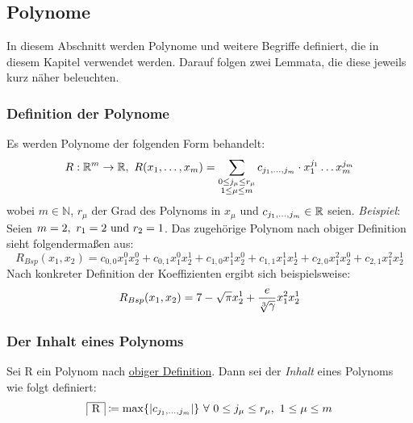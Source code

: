 
\subsection{Polynome}
    \label{subsec:polynomials}
    \textrm{In diesem Abschnitt werden Polynome und weitere Begriffe definiert, die in diesem Kapitel verwendet werden.
    Darauf folgen zwei Lemmata, die diese jeweils kurz näher beleuchten.}
    
    \subsubsection{Definition der Polynome}
        \label{subsubsec:def-poly}
        Es werden Polynome der folgenden Form behandelt:
        \begin{equation}
            R : \mathbb{R}^m \rightarrow \mathbb{R},\
            R(x_1, \dots, x_m) = \sum_{\substack{0 \leq j_\mu \leq r_\mu \\ 1 \leq \mu \leq m}}
            c_{j_1, \dots, j_m} \cdot x_1^{j_1} \dots x_m^{j_m} \label{eq:def-poly}
        \end{equation}
        wobei $m \in \mathbb{N}$, $r_\mu$ der Grad des Polynoms in $x_\mu$ und $c_{j_1, \dots, j_m} \in \mathbb{R}$ seien.
        \newpage
        \emph{Beispiel}: Seien $m = 2,\ r_1 = 2 \ \textrm{und}\  r_2 = 1$.
        \newline
        \textrm{Das zugehörige Polynom nach obiger Definition sieht folgendermaßen aus:}
        \begin{equation*}
            R_{Bsp}(x_1, x_2) = c_{0,0} x_1^0 x_2^0 + c_{0,1} x_1^0 x_2^1 + c_{1,0} x_1^1 x_2^0 + c_{1,1} x_1^1 x_2^1 +
            c_{2, 0} x_1^2 x_2^0 + c_{2,1} x_1^2 x_2^1
        \end{equation*}
        Nach konkreter Definition der Koeffizienten ergibt sich beispielsweise:
        \begin{equation*}
            R_{Bsp}(x_1, x_2) = 7 - \sqrt{\pi} x_2^1 + \frac{e}{\sqrt[3]{\gamma}} x_1^2 x_2^1
        \end{equation*}
    
    \subsubsection{Der Inhalt eines Polynoms}
        \label{subsubsec:def-content}
        Sei R ein Polynom nach \hyperref[subsubsec:def-poly]{obiger Definition}.
        \newline
        Dann sei der \emph{Inhalt} eines Polynoms wie folgt definiert:
        \begin{equation}
            \content{R} \coloneq \max\{|c_{\enum{j_1}{j_m}}| \} \  \forall \  0 \leq j_\mu \leq r_\mu, \
            1 \leq \mu \leq m \label{eq:def-content}
        \end{equation}
    
